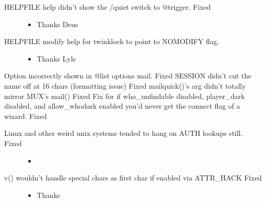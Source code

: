 \documentclass[letterpaper,10pt,english]{sphinxmanual}
\begin{document}
\begin{description}
\begin{itemize}
\end{itemize}

\item[{HELPFILE \sphinxhyphen{} help didn’t show the /quiet switch to @trigger. \sphinxhyphen{} Fixed}] \leavevmode\begin{itemize}
\item {} 
\sphinxAtStartPar
Thanks Deus 

\end{itemize}

\item[{HELPFILE \sphinxhyphen{} modify help for twinklock to point to NOMODIFY flag.}] \leavevmode\begin{itemize}
\item {} 
\sphinxAtStartPar
Thanks Lyle

\end{itemize}

\end{description}

\sphinxAtStartPar
Option incorrectly shown in @list options mail. \sphinxhyphen{} Fixed
SESSION didn’t cut the name off at 16 chars (formatting issue) \sphinxhyphen{} Fixed
mailquick()’s arg didn’t totally mirror MUX’s mail()  \sphinxhyphen{} Fixed
Fix for if who\_unfindable disabled, player\_dark disabled, and allow\_whodark enabled you’d never get the connect flag of a wizard. \sphinxhyphen{} Fixed
\begin{description}
\item[{Linux and other weird unix systems tended to hang on AUTH lookups still. \sphinxhyphen{} Fixed}] \leavevmode\begin{itemize}
\item {} 
\sphinxAtStartPar
{}

\end{itemize}

\item[{v() wouldn’t handle special chars as first char if enabled via ATTR\_HACK \sphinxhyphen{} Fixed}] \leavevmode\begin{itemize}
\item {} 
\sphinxAtStartPar
Thanks 

\end{itemize}

\end{description}
\end{document}
